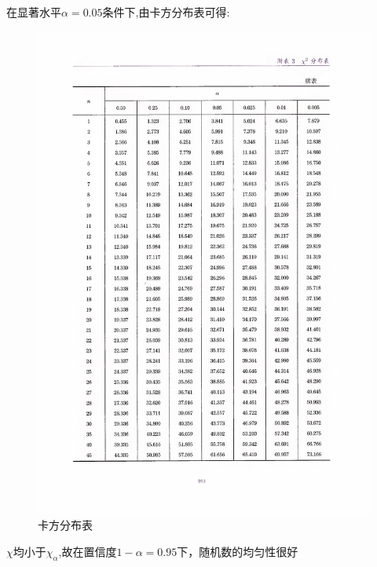 \documentclass[UTF8]{ctexart}
\begin{document}
在显著水平$\alpha =0.05$条件下,由卡方分布表可得:
\begin{figure}[H]
    \centering
    \includegraphics[scale=0.1]{1}
    \caption{卡方分布表}
\end{figure}

$\chi $均小于$\chi _\alpha $,故在置信度$1-\alpha =0.95$下，随机数的均匀性很好
\end{document}
